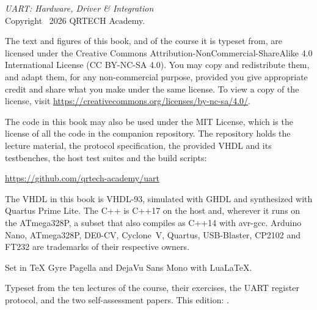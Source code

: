 \thispagestyle{empty}
\vspace*{\fill}
{\small
\noindent\textit{UART: Hardware, Driver \& Integration}\\
Copyright \textcopyright\ 2026 QRTECH Academy.

\medskip
\noindent The text and figures of this book, and of the course it is typeset from, are licensed
under the Creative Commons Attribution-NonCommercial-ShareAlike 4.0 International License
(CC BY-NC-SA 4.0). You may copy and redistribute them, and adapt them, for any non-commercial
purpose, provided you give appropriate credit and share what you make under the same license. To
view a copy of the license, visit \url{https://creativecommons.org/licenses/by-nc-sa/4.0/}.

\medskip
\noindent The code in this book may also be used under the MIT License, which is the license of all
the code in the companion repository. The repository holds the lecture material, the protocol
specification, the provided VHDL and its testbenches, the host test suites and the build scripts:

\medskip
\noindent\url{https://github.com/qrtech-academy/uart}

\medskip
\noindent The VHDL in this book is VHDL-93, simulated with GHDL and synthesized with Quartus Prime
Lite. The C++ is C++17 on the host and, wherever it runs on the ATmega328P, a subset that also
compiles as C++14 with avr-gcc. Arduino Nano, ATmega328P, DE0-CV, Cyclone~V, Quartus, USB-Blaster,
CP2102 and FT232 are trademarks of their respective owners.

\medskip
\noindent Set in TeX Gyre Pagella and DejaVu Sans Mono with Lua\LaTeX.

\medskip
\noindent\textcolor{muted}{Typeset from the ten lectures of the course, their exercises, the UART
register protocol, and the two self-assessment papers. This edition: \bookedition.}
\par}
\cleardoublepage
